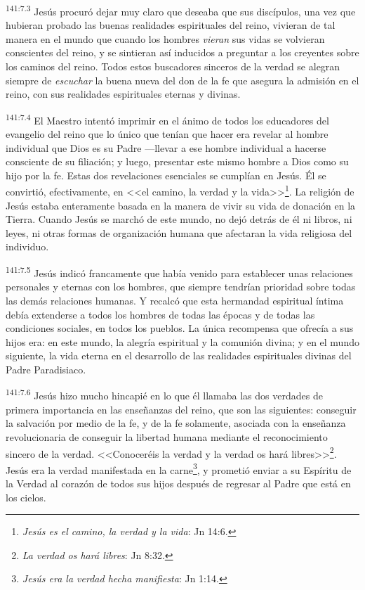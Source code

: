 \par 
\textsuperscript{141:7.3} Jesús procuró dejar muy claro que deseaba que sus discípulos, una vez que hubieran probado las buenas realidades espirituales del reino, vivieran de tal manera en el mundo que cuando los hombres \textit{vieran} sus vidas se volvieran conscientes del reino, y se sintieran así inducidos a preguntar a los creyentes sobre los caminos del reino. Todos estos buscadores sinceros de la verdad se alegran siempre de \textit{escuchar} la buena nueva del don de la fe que asegura la admisión en el reino, con sus realidades espirituales eternas y divinas.

\par 
\textsuperscript{141:7.4} El Maestro intentó imprimir en el ánimo de todos los educadores del evangelio del reino que lo único que tenían que hacer era revelar al hombre individual que Dios es su Padre ---llevar a ese hombre individual a hacerse consciente de su filiación; y luego, presentar este mismo hombre a Dios como su hijo por la fe. Estas dos revelaciones esenciales se cumplían en Jesús. Él se convirtió, efectivamente, en <<el camino, la verdad y la vida>>\footnote{\textit{Jesús es el camino, la verdad y la vida}: Jn 14:6.}. La religión de Jesús estaba enteramente basada en la manera de vivir su vida de donación en la Tierra. Cuando Jesús se marchó de este mundo, no dejó detrás de él ni libros, ni leyes, ni otras formas de organización humana que afectaran la vida religiosa del individuo.

\par 
\textsuperscript{141:7.5} Jesús indicó francamente que había venido para establecer unas relaciones personales y eternas con los hombres, que siempre tendrían prioridad sobre todas las demás relaciones humanas. Y recalcó que esta hermandad espiritual íntima debía extenderse a todos los hombres de todas las épocas y de todas las condiciones sociales, en todos los pueblos. La única recompensa que ofrecía a sus hijos era: en este mundo, la alegría espiritual y la comunión divina; y en el mundo siguiente, la vida eterna en el desarrollo de las realidades espirituales divinas del Padre Paradisiaco.

\par 
\textsuperscript{141:7.6} Jesús hizo mucho hincapié en lo que él llamaba las dos verdades de primera importancia en las enseñanzas del reino, que son las siguientes: conseguir la salvación por medio de la fe, y de la fe solamente, asociada con la enseñanza revolucionaria de conseguir la libertad humana mediante el reconocimiento sincero de la verdad. <<Conoceréis la verdad y la verdad os hará libres>>\footnote{\textit{La verdad os hará libres}: Jn 8:32.}. Jesús era la verdad manifestada en la carne\footnote{\textit{Jesús era la verdad hecha manifiesta}: Jn 1:14.}, y prometió enviar a su Espíritu de la Verdad al corazón de todos sus hijos después de regresar al Padre que está en los cielos.


